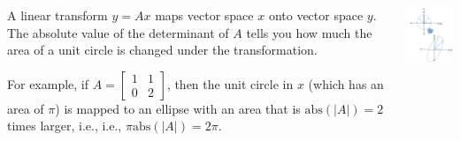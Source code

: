 \documentclass{beamer}
\begin{document}
\begin{frame}
  \begin{columns}[t]
    \column{2.75in}
    \begin{block}{}
      A linear transform ${y}=A{x}$ maps vector
      space ${x}$ onto vector space ${y}$.  The absolute value of the
      determinant of $A$ tells you how much the area of a unit circle is
      changed under the transformation.
      
      For example, if
      $A=\left[\begin{array}{cc}1&1\\0&2\end{array}\right]$, then the
      unit circle in ${x}$ (which has an area of $\pi$) is mapped to
      an ellipse with an area that is $\mbox{abs}(|A|)=2$ times larger, i.e.,
      i.e., $\pi\mbox{abs}(|A|)=2\pi$.
    \end{block}
    \column{1.5in}
    \begin{block}{}
      \includegraphics[width=1.45in]{linalg_review_fig1.png}
    \end{block}
  \end{columns}
\end{frame}
\end{document}
